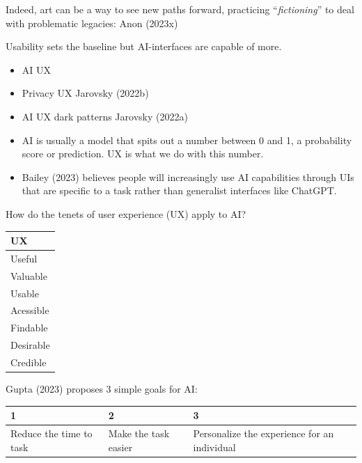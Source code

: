 \documentclass[
  letterpaper,
  DIV=11,
  numbers=noendperiod]{scrartcl}
\begin{document}
Indeed, art can be a way to see new paths forward, practicing
``\emph{fictioning}'' to deal with problematic legacies: Anon (2023x)

Usability sets the baseline but AI-interfaces are capable of more.

\begin{itemize}
\item
  AI UX
\item
  Privacy UX Jarovsky (2022b)
\item
  AI UX dark patterns Jarovsky (2022a)
\item
  AI is usually a model that spits out a number between 0 and 1, a
  probability score or prediction. UX is what we do with this number.
\item
  Bailey (2023) believes people will increasingly use AI capabilities
  through UIs that are specific to a task rather than generalist
  interfaces like ChatGPT.
\end{itemize}

How do the tenets of user experience (UX) apply to AI?

\begin{longtable}[]{@{}l@{}}
\toprule\noalign{}
UX \\
\midrule\noalign{}
\endhead
\bottomrule\noalign{}
\endlastfoot
Useful \\
Valuable \\
Usable \\
Acessible \\
Findable \\
Desirable \\
Credible \\
\end{longtable}

Gupta (2023) proposes 3 simple goals for AI:

\begin{longtable}[]{@{}
  >{\raggedright\arraybackslash}p{}
  >{\raggedright\arraybackslash}p{}
  >{\raggedright\arraybackslash}p{}@{}}
\toprule\noalign{}
\begin{minipage}[b]{\linewidth}\raggedright
1
\end{minipage} & \begin{minipage}[b]{\linewidth}\raggedright
2
\end{minipage} & \begin{minipage}[b]{\linewidth}\raggedright
3
\end{minipage} \\
\midrule\noalign{}
\endhead
\bottomrule\noalign{}
\endlastfoot
Reduce the time to task & Make the task easier & Personalize the
experience for an individual \\
\end{longtable}
\end{document}
